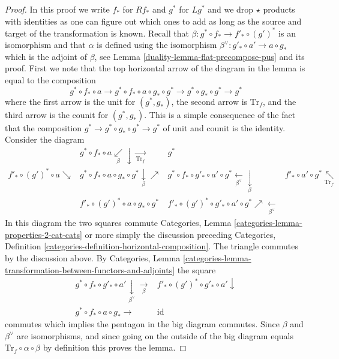 \begin{proof}

In this proof we write $f_*$ for $Rf_*$ and $g^*$ for $Lg^*$ and we
drop $\star$ products with identities as one can figure out which ones
to add as long as the source and target of the transformation is known.
Recall that $\beta : g^* \circ f_* \to f'_* \circ (g')^*$ is an isomorphism
and that $\alpha$ is defined using
the isomorphism $\beta^\vee : g'_* \circ a' \to a \circ g_*$
which is the adjoint of $\beta$, see Lemma \ref{duality-lemma-flat-precompose-pus}
and its proof. First we note that the top horizontal arrow
of the diagram in the lemma is equal to the composition
$$
g^* \circ f_* \circ a \to
g^* \circ f_* \circ a \circ g_* \circ g^* \to
g^* \circ g_* \circ g^* \to g^*
$$
where the first arrow is the unit for $(g^*, g_*)$, the second arrow
is $\text{Tr}_f$, and the third arrow is the counit for $(g^*, g_*)$.
This is a simple consequence of the fact that the composition
$g^* \to g^* \circ g_* \circ g^* \to g^*$ of unit and counit is the identity.
Consider the diagram
$$
\begin{array}{cccc} & g^* \circ f_* \circ a \underset{\beta}{\swarrow}\downarrow\underset{\text{Tr}_f}{\longrightarrow} & g^* &  \\ f'_* \circ (g')^* \circ a \searrow & g^* \circ f_* \circ a \circ g_* \circ g^* \underset{\beta}{\downarrow}\nearrow & g^* \circ f_* \circ g'_* \circ a' \circ g^* \underset{\beta^\vee}{\longleftarrow}\underset{\beta}{\downarrow} & f'_* \circ a' \circ g^* \underset{\text{Tr}_{f'}}{\nwarrow} \\  & f'_* \circ (g')^* \circ a \circ g_* \circ g^* & f'_* \circ (g')^* \circ g'_* \circ a' \circ g^* \nearrow\underset{\beta^\vee}{\longleftarrow} & \end{array}
$$
In this diagram the two squares commute
Categories, Lemma \ref{categories-lemma-properties-2-cat-cats}
or more simply the discussion preceding
Categories, Definition \ref{categories-definition-horizontal-composition}.
The triangle commutes by the discussion above. By
Categories, Lemma
\ref{categories-lemma-transformation-between-functors-and-adjoints}
the square
$$
\begin{array}{cc}g^* \circ f_* \circ g'_* \circ a' \underset{\beta^\vee}{\downarrow}\underset{\beta}{\longrightarrow} & f'_* \circ (g')^* \circ g'_* \circ a' \downarrow \\ g^* \circ f_* \circ a \circ g_* \longrightarrow & \text{id}\end{array}
$$
commutes which implies the pentagon in the big diagram commutes.
Since $\beta$ and $\beta^\vee$ are isomorphisms, and since going on
the outside of the big diagram equals
$\text{Tr}_f \circ \alpha \circ \beta$ by definition this proves the lemma.
\end{proof}

